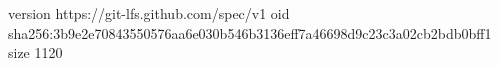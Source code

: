 version https://git-lfs.github.com/spec/v1
oid sha256:3b9e2e70843550576aa6e030b546b3136eff7a46698d9c23c3a02cb2bdb0bff1
size 1120
